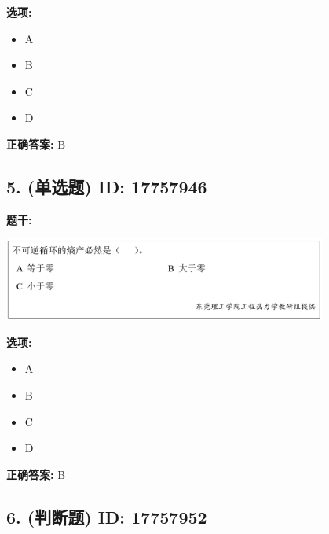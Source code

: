 \documentclass[12pt]{article}
\begin{document}
\textbf{选项:}
\begin{itemize}[leftmargin=*]
  \item A

  \item B

  \item C

  \item D

\end{itemize}

\textbf{正确答案:}
B

\vspace{0.5em}\hrulefill\vspace{1em}

\subsection*{5. (单选题) \small ID: 17757946}

\textbf{题干:}


\begin{center}\includegraphics[width=0.8\textwidth, height=0.25\textheight, keepaspectratio]{question_5_17757946/title_img_1.png}\end{center}

\textbf{选项:}
\begin{itemize}[leftmargin=*]
  \item A

  \item B

  \item C

  \item D

\end{itemize}

\textbf{正确答案:}
B

\vspace{0.5em}\hrulefill\vspace{1em}

\subsection*{6. (判断题) \small ID: 17757952}
\end{document}
